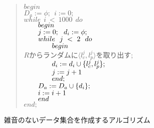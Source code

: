 \begin{figure}[hpbt]
{\small
\begin{quote}
\hspace*{2em}
$begin$ \\
\hspace*{2em}
$D_a := \phi; ~~i := 0;$ \\
\hspace*{2em}
$while~~ i ~<~ 1000 ~~do$ \\
\hspace*{2em}
$\mbox{\hspace*{2em}}begin$ \\
\hspace*{2em}
$\mbox{\hspace*{2em}}j := 0; ~~d_i:=\phi;$ \\
\hspace*{2em}
$\mbox{\hspace*{2em}}while~~ j ~<~ 2 ~~do$ \\
\hspace*{2em}
$\mbox{\hspace*{4em}}begin$ \\
\hspace*{2em}
\hspace*{4em}
$R$からランダムに$\langle l^j_c, l^j_p\rangle$を取り出す; \\
\hspace*{2em}
$\mbox{\hspace*{4em}}d_i := d_i \cup
 \{l_c^j,l_p^j\};$\\ 
\hspace*{2em}
$\mbox{\hspace*{4em}}j := j + 1$ \\
\hspace*{2em}
$\mbox{\hspace*{4em}}end;$ \\
\hspace*{2em}
$\mbox{\hspace*{2em}}D_a := D_a \cup \{d_i\};$ \\
\hspace*{2em}
$\mbox{\hspace*{2em}}i := i + 1$ \\
\hspace*{2em}
$\mbox{\hspace*{2em}}end$ \\
\hspace*{2em}
$end;$ 
\end{quote}
}
\caption{雑音のないデータ集合を作成するアルゴリズム} \label{algo:art_data}
\end{figure}
